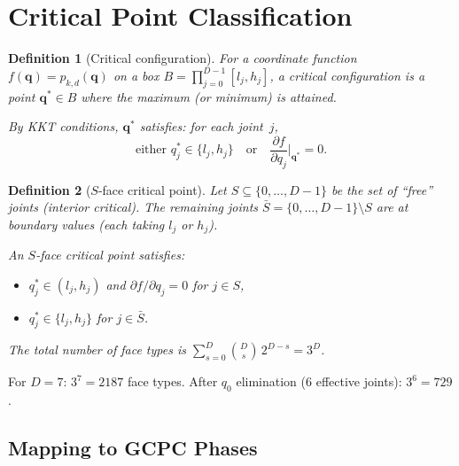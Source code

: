 \documentclass[11pt,a4paper]{article}
\newtheorem{definition}{Definition}[section]
\newcommand{\bq}{\mathbf{q}}
\begin{document}
\section{Critical Point Classification}\label{sec:classification}

\begin{definition}[Critical configuration]\label{def:critical}
For a coordinate function $f(\bq) = p_{k,d}(\bq)$ on a box
$B = \prod_{j=0}^{D-1} [l_j, h_j]$, a \emph{critical configuration}
is a point $\bq^* \in B$ where the maximum (or minimum) is attained.

By KKT conditions, $\bq^*$ satisfies: for each joint~$j$,
\begin{equation}
  \text{either } q_j^* \in \{l_j, h_j\} \quad
  \text{or} \quad \frac{\partial f}{\partial q_j}\biggr|_{\bq^*} = 0.
\end{equation}
\end{definition}

\begin{definition}[$S$-face critical point]\label{def:S_face}
Let $S \subseteq \{0,\ldots,D-1\}$ be the set of ``free'' joints
(interior critical). The remaining joints $\bar{S} = \{0,\ldots,D-1\}
\setminus S$ are at boundary values (each taking $l_j$ or $h_j$).

An \emph{$S$-face critical point} satisfies:
\begin{itemize}
  \item $q_j^* \in (l_j, h_j)$ and $\partial f/\partial q_j = 0$
        for $j \in S$,
  \item $q_j^* \in \{l_j, h_j\}$ for $j \in \bar{S}$.
\end{itemize}
The total number of face types is
$\sum_{s=0}^{D} \binom{D}{s}\,2^{D-s} = 3^D$.
\end{definition}

For $D = 7$: $3^7 = 2187$ face types. After $q_0$ elimination
(6 effective joints): $3^6 = 729$.

\subsection{Mapping to GCPC Phases}
\end{document}

